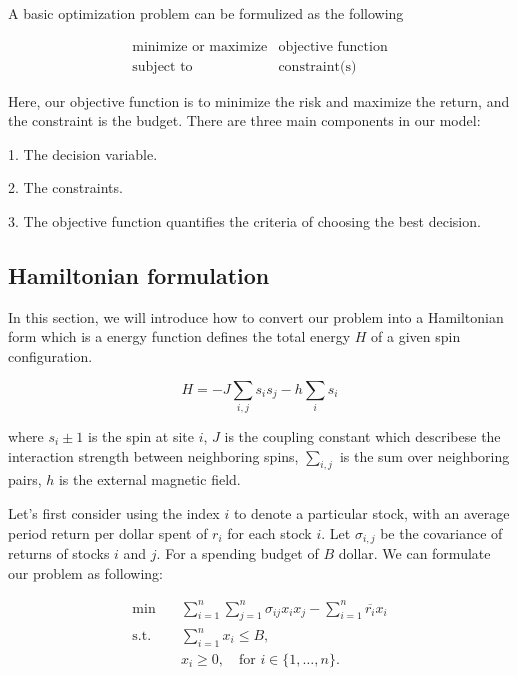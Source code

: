 \documentclass[12pt]{article}
\begin{document}
A basic optimization problem can be formulized as the following 

\begin{equation}
    \begin{array}{ll}
        \text{minimize or maximize} & \text{objective function}\\
        \text{subject to} & \text{constraint(s)}
    \end{array}
\end{equation}

Here, our objective function is to minimize the risk and maximize the return, and the constraint is the budget. There are three main components in our model: 

1.  The decision variable.

2.  The constraints.

3.  The objective function quantifies the criteria of choosing the best decision. 

\subsection{Hamiltonian formulation}

In this section, we will introduce how to convert our problem into a Hamiltonian form which is a energy function defines the total energy $H$ of a given spin configuration.

\begin{equation}
    H = -J\sum_{i,j}s_{i}s_{j} - h\sum_{i}s_{i}
\label{eq:Hamiltonian}
\end{equation}

where $s_{i} \pm 1$ is the spin at site $i$, $J$ is the coupling constant which describese the interaction strength between neighboring spins, $\sum_{i,j}$ is the sum over neighboring pairs, $h$ is the external magnetic field. 

Let's first consider using the index $i$ to denote a particular stock, with an average period return per dollar spent of $r_{i}$ for each stock $i$. Let $\sigma_{i,j}$ be the covariance of returns of stocks $i$ and $j$. For a spending budget of $B$ dollar. We can formulate our problem as following:

\begin{equation}
\begin{aligned}
\text{min} \quad & \sum_{i=1}^{n}\sum_{j=1}^{n} \sigma_{ij}x_{i}x_{j} - \sum_{i=1}^{n} \overline{r_{i}} x_{i}\\
\text{s.t.} \quad &\sum_{i=1}^{n} x_{i} \leq B, \\
            & x_{i} \geq 0, \quad \text{for } i \in \{1, \dots, n\}.
\end{aligned}
\label{eq:base formula}
\end{equation}
\end{document}
